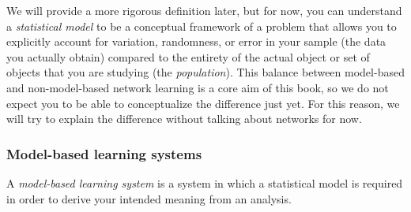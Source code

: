 We will provide a more rigorous definition later, but for now, you can understand a \textit{statistical model} to be a conceptual framework of a problem that allows you to explicitly account for variation, randomness, or error in your sample (the data you actually obtain) compared to the entirety of the actual object or set of objects that you are studying (the \textit{population}). This balance between model-based and non-model-based network learning is a core aim of this book, so we do not expect you to be able to conceptualize the difference just yet. For this reason, we will try to explain the difference without talking about networks for now.


\subsubsection{Model-based learning systems}

A \textit{model-based learning system} is a system in which a statistical model is required in order to derive your intended meaning from an analysis.

